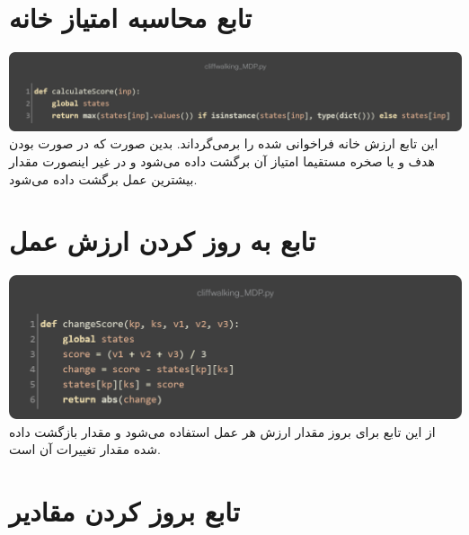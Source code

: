 \documentclass[12pt, dvipsnames, svgnames, x11names,]{article}
\begin{document}
		
	\section{تابع محاسبه امتیاز خانه}
	
		{\includegraphics[width=14cm]{images/03}}
		{\normalsize این تابع ارزش خانه فراخوانی شده را برمی‌گرداند. بدین صورت که در صورت بودن هدف و یا صخره مستقیما امتیاز آن برگشت داده می‌شود و در غیر اینصورت مقدار بیشترین عمل برگشت داده می‌شود.}
	
		
	\section{تابع به روز کردن ارزش عمل}
	
		{\includegraphics[width=14cm]{images/04}}
		{\normalsize از این تابع برای بروز مقدار ارزش هر عمل استفاده می‌شود و مقدار بازگشت داده شده مقدار تغییرات آن است.}
		
	\newpage
	\section{تابع بروز کردن مقادیر }
	
\end{document}
